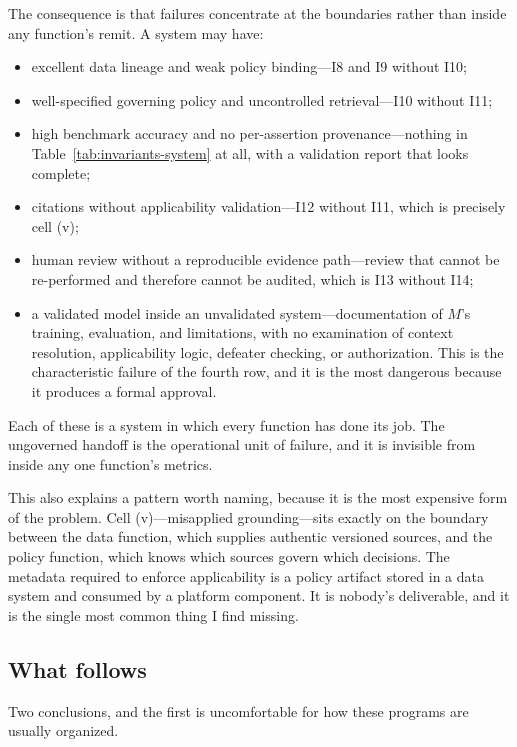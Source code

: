 The consequence is that failures concentrate at the boundaries rather than inside
any function's remit. A system may have:

\begin{itemize}
  \item excellent data lineage and weak policy binding---I8 and I9 without I10;
  \item well-specified governing policy and uncontrolled retrieval---I10 without
        I11;
  \item high benchmark accuracy and no per-assertion provenance---nothing in
        Table~\ref{tab:invariants-system} at all, with a validation report that
        looks complete;
  \item citations without applicability validation---I12 without I11, which is
        precisely cell (v);
  \item human review without a reproducible evidence path---review that cannot be
        re-performed and therefore cannot be audited, which is I13 without I14;
  \item a validated model inside an unvalidated system---documentation of $M$'s
        training, evaluation, and limitations, with no examination of context
        resolution, applicability logic, defeater checking, or authorization. This is
        the characteristic failure of the fourth row, and it is the most dangerous
        because it produces a formal approval.
\end{itemize}

Each of these is a system in which every function has done its job. The ungoverned
handoff is the operational unit of failure, and it is invisible from inside any one
function's metrics.

This also explains a pattern worth naming, because it is the most expensive form of
the problem. Cell (v)---misapplied grounding---sits exactly on the boundary between
the data function, which supplies authentic versioned sources, and the policy
function, which knows which sources govern which decisions. The metadata required to
enforce applicability is a policy artifact stored in a data system and consumed by a
platform component. It is nobody's deliverable, and it is the single most common
thing I find missing.

\subsection{What follows}

Two conclusions, and the first is uncomfortable for how these programs are
usually organized.

